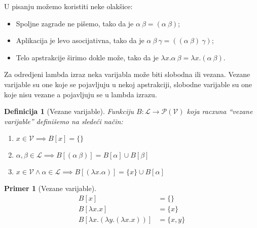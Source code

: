 \documentclass[10pt,a4paper,oneside]{article}
\newtheorem*{definition}{Definicija}
\newtheorem*{primer}{Primer}
\begin{document}
    U pisanju mo\v{z}emo koristiti neke olak\v{s}ice:
    \begin{itemize}
      \item Spoljne zagrade ne pi\v{s}emo, tako da je \(\alpha\ \beta = (\alpha\ \beta)\)\;;
      \item Aplikacija je levo asocijativna, tako da je \(\alpha\ \beta\ \gamma = ((\alpha\ \beta)\ \gamma)\)\;;
      \item Telo apstrakcije \v{s}irimo dokle mo\v{z}e, tako da je \(\lambda x.\alpha\ \beta = \lambda x.(\alpha\ \beta)\)\;.
    \end{itemize}

    Za odredjeni lambda izraz neka varijabla mo\v{z}e biti slobodna ili vezana.
    Vezane varijable su one koje se pojavljuju u nekoj apstrakciji, slobodne varijable su one koje nisu vezane a pojavljuju se u lambda izrazu. 

    \begin{definition}[Vezane varijable]
      Funkciju \(B : \mathcal{L} \to \mathcal{P}(\mathcal{V})\) koja racxuna ``vezane varijable'' defini\v{s}emo na slede\'{c}i na\v{c}in:
      \begin{enumerate}
        \item
          \(
            x \in \mathcal{V} \implies
            B[x] = \{\}
          \)
        \item
          \(
            \alpha, \beta \in \mathcal{L} \implies
            B[(\alpha\ \beta)] = B[\alpha] \cup B[\beta]
          \)
        \item
          \(
            x \in \mathcal{V} \land
            \alpha \in \mathcal{L} \implies
            B[(\lambda x.\alpha)] = \{x\} \cup B[\alpha]
          \)
      \end{enumerate}
    \end{definition}
    \begin{primer}[Vezane varijable]
      \begin{align*}
        B[x] &= \{\}\\
        B[\lambda x.x] &= \{x\}\\
        B[\lambda x.(\lambda y.(\lambda x.x))] &= \{x, y\}
      \end{align*}
    \end{primer}
\end{document}

